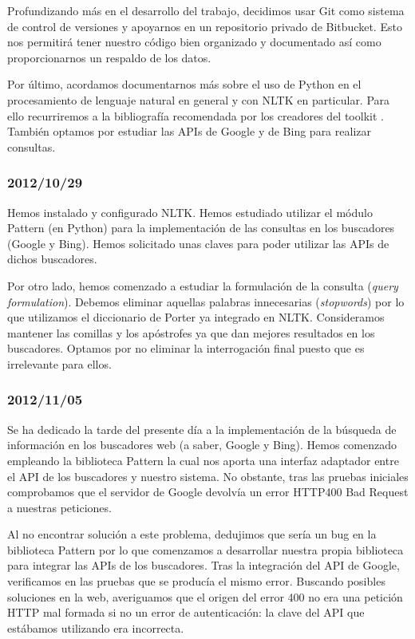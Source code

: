 \documentclass[12pt,a4paper,titlepage]{article}
\begin{document}
Profundizando más en el desarrollo del trabajo, decidimos usar Git como sistema de control de versiones y apoyarnos en un repositorio privado de Bitbucket. Esto nos permitirá tener nuestro código bien organizado y documentado así como proporcionarnos un respaldo de los datos.

Por último, acordamos documentarnos más sobre el uso de Python en el procesamiento de lenguaje natural en general y con NLTK en particular. Para ello recurriremos a la bibliografía recomendada por los creadores del toolkit \cite{nltk_book}. También optamos por estudiar las APIs de Google y de Bing para realizar consultas.

\subsubsection*{2012/10/29}
Hemos instalado y configurado NLTK. Hemos estudiado utilizar el módulo Pattern (en Python) para la implementación de las consultas en los buscadores (Google y Bing). Hemos solicitado unas claves para poder utilizar las APIs de dichos buscadores.

Por otro lado, hemos comenzado a estudiar la formulación de la consulta (\emph{query formulation}). Debemos eliminar aquellas palabras innecesarias (\emph{stopwords}) por lo que utilizamos el diccionario de Porter ya integrado en NLTK. Consideramos mantener las comillas y los apóstrofes ya que dan mejores resultados en los buscadores. Optamos por no eliminar la interrogación final puesto que es irrelevante para ellos.

\subsubsection*{2012/11/05}
Se ha dedicado la tarde del presente día a la implementación de la búsqueda de información en los buscadores web (a saber, Google y Bing). Hemos comenzado empleando la biblioteca Pattern\cite{pattern_web} la cual nos aporta una interfaz adaptador entre el API de los buscadores y nuestro sistema. No obstante, tras las pruebas iniciales comprobamos que el servidor de Google devolvía un error HTTP400 Bad Request a nuestras peticiones.

Al no encontrar solución a este problema, dedujimos que sería un bug en la biblioteca Pattern por lo que comenzamos a desarrollar nuestra propia biblioteca para integrar las APIs de los buscadores. Tras la integración del API de Google, verificamos en las pruebas que se producía el mismo error. Buscando posibles soluciones en la web, averiguamos que el origen del error 400 no era una petición HTTP mal formada si no un error de autenticación: la clave del API que estábamos utilizando era incorrecta.
\end{document}
